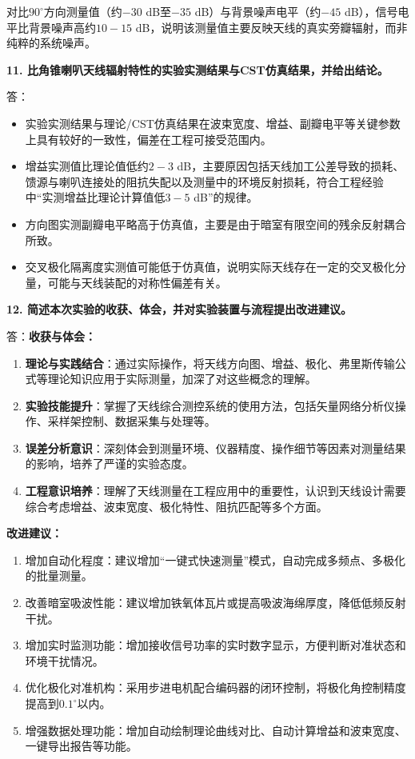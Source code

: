 \documentclass[12pt,a4paper]{article}
\begin{document}
对比$90^\circ$方向测量值（约$-30$ dB至$-35$ dB）与背景噪声电平（约$-45$ dB），信号电平比背景噪声高约$10-15$ dB，说明该测量值主要反映天线的真实旁瓣辐射，而非纯粹的系统噪声。


\textbf{11. 比角锥喇叭天线辐射特性的实验实测结果与CST仿真结果，并给出结论。}

答：
\begin{itemize}
    \item 实验实测结果与理论/CST仿真结果在波束宽度、增益、副瓣电平等关键参数上具有较好的一致性，偏差在工程可接受范围内。
    \item 增益实测值比理论值低约$2-3$ dB，主要原因包括天线加工公差导致的损耗、馈源与喇叭连接处的阻抗失配以及测量中的环境反射损耗，符合工程经验中“实测增益比理论计算值低$3-5$ dB”的规律。
    \item 方向图实测副瓣电平略高于仿真值，主要是由于暗室有限空间的残余反射耦合所致。
    \item 交叉极化隔离度实测值可能低于仿真值，说明实际天线存在一定的交叉极化分量，可能与天线装配的对称性偏差有关。
\end{itemize}


\textbf{12. 简述本次实验的收获、体会，并对实验装置与流程提出改进建议。}

答：\textbf{收获与体会：}
\begin{enumerate}
    \item \textbf{理论与实践结合}：通过实际操作，将天线方向图、增益、极化、弗里斯传输公式等理论知识应用于实际测量，加深了对这些概念的理解。
    \item \textbf{实验技能提升}：掌握了天线综合测控系统的使用方法，包括矢量网络分析仪操作、采样架控制、数据采集与处理等。
    \item \textbf{误差分析意识}：深刻体会到测量环境、仪器精度、操作细节等因素对测量结果的影响，培养了严谨的实验态度。
    \item \textbf{工程意识培养}：理解了天线测量在工程应用中的重要性，认识到天线设计需要综合考虑增益、波束宽度、极化特性、阻抗匹配等多个方面。
\end{enumerate}

\textbf{改进建议：}
\begin{enumerate}
    \item 增加自动化程度：建议增加“一键式快速测量”模式，自动完成多频点、多极化的批量测量。
    \item 改善暗室吸波性能：建议增加铁氧体瓦片或提高吸波海绵厚度，降低低频反射干扰。
    \item 增加实时监测功能：增加接收信号功率的实时数字显示，方便判断对准状态和环境干扰情况。
    \item 优化极化对准机构：采用步进电机配合编码器的闭环控制，将极化角控制精度提高到$0.1^\circ$以内。
    \item 增强数据处理功能：增加自动绘制理论曲线对比、自动计算增益和波束宽度、一键导出报告等功能。
\end{enumerate}
\end{document}
